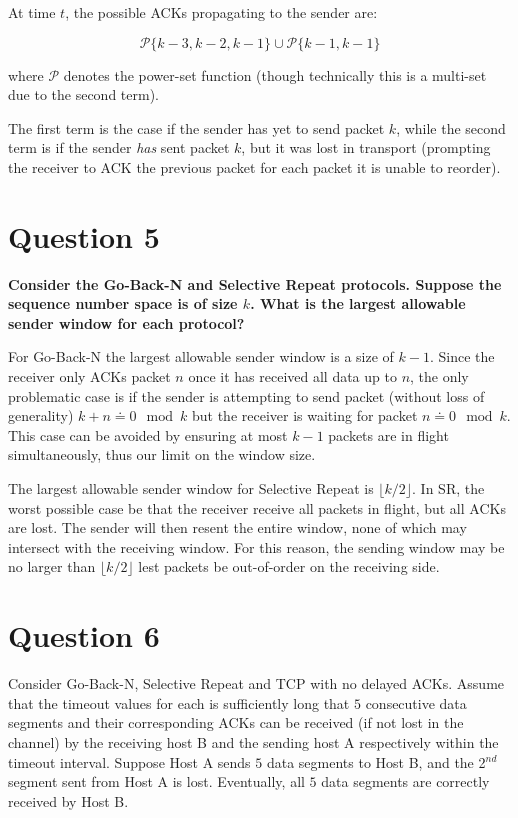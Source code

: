 \documentclass[12pt]{article}
\begin{document}
At time $t$, the possible ACKs propagating to the sender are:

$$\mathcal{P}\{k-3, k-2, k-1\} \cup \mathcal{P}\{k-1, k-1\} $$

where $\mathcal{P}$ denotes the power-set function (though technically this is a multi-set due to the second term). 

The first term is the case if the sender has yet to send packet $k$, while the second term is if the sender \textit{has} sent packet $k$, but it was lost in transport (prompting the receiver to ACK the previous packet for each packet it is unable to reorder).


\section*{Question 5}

\textbf{Consider the Go-Back-N and Selective Repeat protocols. Suppose the sequence number space is of size $k$. What is the largest allowable sender window for each protocol?}

For Go-Back-N the largest allowable sender window is a size of $k-1$. Since the receiver only ACKs packet $n$ once it has received all data up to $n$, the only problematic case is if the sender is attempting to send packet (without loss of generality) $k + n \doteq 0 \mod k$ but the receiver is waiting for packet $n \doteq 0 \mod k$. This case can be avoided by ensuring at most $k-1$ packets are in flight simultaneously, thus our limit on the window size.

The largest allowable sender window for Selective Repeat is $\lfloor k/2 \rfloor$. In SR, the worst possible case be that the receiver receive all packets in flight, but all ACKs are lost. The sender will then resent the entire window, none of which may intersect with the receiving window. For this reason, the sending window may be no larger than $\lfloor k/2 \rfloor$ lest packets be out-of-order on the receiving side.

\section*{Question 6}
Consider Go-Back-N, Selective Repeat and TCP with no delayed ACKs. Assume that the timeout values for each is sufficiently long that $5$ consecutive data segments and their corresponding ACKs can be received (if not lost in the channel) by the receiving host B and the sending host A respectively within the timeout interval. Suppose Host A sends $5$ data segments to Host B, and the 2$^{nd}$ segment sent from Host A is lost. Eventually, all $5$ data segments are correctly received by Host B.
\end{document}
